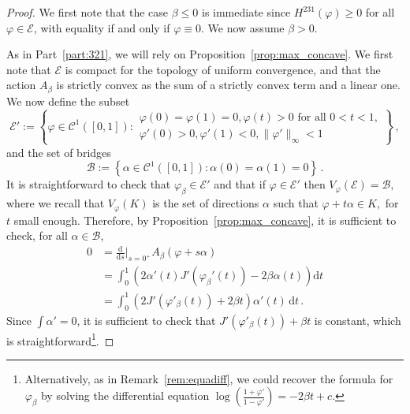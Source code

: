 \documentclass[a4paper,11pt]{amsart}
\newcommand{\ee}{\textup{e}}
\newcommand{\R}{\mathbb R}
\theoremstyle{definition}
\begin{document}
\begin{proof}
	We first note that the case $\beta \leq 0$ is immediate since $H^{231}(\varphi) \geq 0$ for all $\varphi \in \mathcal{E}$, with equality if and only if $\varphi\equiv0$. 
    We now assume $\beta>0$.
	
	As in Part~\ref{part:321}, we will rely on Proposition~\ref{prop:max_concave}. We first note that $\mathcal{E}$ is compact for the topology of uniform convergence, and that the action $A_{\beta}$ is strictly convex as the sum of a strictly convex term and a linear one.
    We now define the subset
    \[
        \mathcal{E}' := \left\{ \varphi \in \mathcal{C}^1([0,1]) : 
        \begin{array}{ll} \varphi(0) = \varphi(1) = 0, \varphi(t) > 0 \text{ for all }0<t<1,\\
            \varphi'(0) > 0, \varphi'(1) < 0, \lVert \varphi' \rVert_\infty < 1 \end{array} 
        \right\} \,,
    \]
    and the set of bridges
    \[
        \mathcal{B} := \left\{ \alpha \in \mathcal{C}^1([0,1]) : \alpha(0) = \alpha(1) = 0 \right\} \,.
    \]
    It is straightforward to check that $\varphi_{\beta} \in \mathcal{E}'$ and that if $\varphi \in \mathcal{E}'$ then $V_\varphi(\mathcal{E}) = \mathcal{B},$ where we recall that $V_\varphi(K)$ is the set of directions $\alpha$ such that $\varphi + t\alpha \in K,$ for $t$ small enough.
    Therefore, by Proposition~\ref{prop:max_concave}, it is sufficient to check, for all $\alpha \in \mathcal{B}$,
    \begin{align*}
        0 &= \frac{\mathrm{d}}{\mathrm{d}s}\Big|_{s=0^+} A_{\beta} \left( \varphi+s\alpha \right)\\
        &= \int_0^1 \left( 2\alpha'(t) J'(\varphi_{\beta}'(t)) - 2\beta\alpha(t) \right) \mathrm dt\\
      	&= \int_0^1 \left( 2J'(\varphi'_{\beta}(t)) +2\beta t \right) \alpha'(t) \, \mathrm dt \, .
    \end{align*}
    Since $\int \alpha' = 0$, it is sufficient to check that $J'(\varphi'_{\beta}(t))+\beta t$ is constant, which is straightforward\footnote{
        Alternatively, as in Remark~\ref{rem:equadiff}, we could recover the formula for $\varphi_{\beta}$ by solving the differential equation $\log\left(\frac{1+\varphi'}{1-\varphi'}\right) = -2\beta t + c$.
    }.
\end{proof}
\end{document}
